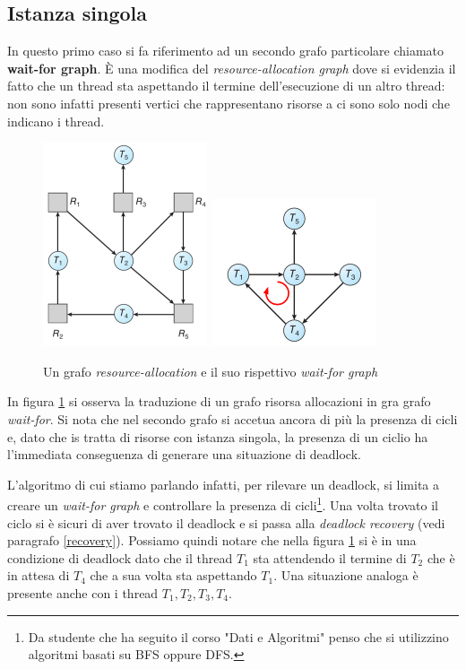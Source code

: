 \subsection{Istanza singola}
In questo primo caso si fa riferimento ad un secondo grafo particolare chiamato \textbf{wait-for graph}. È una modifica del \textit{resource-allocation graph} dove si evidenzia il fatto che un thread sta aspettando il termine dell'esecuzione di un altro thread: non sono infatti presenti vertici che rappresentano risorse a ci sono solo nodi che indicano i thread.
\begin{figure}[h]
    \centering
    \includegraphics[width = .25\textwidth]{../res/imgs/deadlocks/unsafe.png}
    \hspace{10pt}
    \includegraphics[width = .35\textwidth]{../res/imgs/deadlocks/wait-for_graph.png}
    \caption{Un grafo \textit{resource-allocation} e il suo rispettivo \textit{wait-for graph}}
    \label{fig:wait-for}
\end{figure}
In figura \ref{fig:wait-for} si osserva la traduzione di un grafo risorsa allocazioni in gra grafo \textit{wait-for}. Si nota che nel secondo grafo si accetua ancora di più la presenza di cicli e, dato che is tratta di risorse con istanza singola, la presenza di un ciclio ha l'immediata conseguenza di generare una situazione di deadlock.

L'algoritmo di cui stiamo parlando infatti, per rilevare un deadlock, si limita a creare un \textit{wait-for graph} e controllare la presenza di cicli\footnote{Da studente che ha seguito il corso "Dati e Algoritmi" penso che si utilizzino algoritmi basati su BFS oppure DFS.}. Una volta trovato il ciclo si è sicuri di aver trovato il deadlock e si passa alla \textit{deadlock recovery} (vedi paragrafo \ref{recovery}). Possiamo quindi notare che nella figura \ref{fig:wait-for} si è in una condizione di deadlock dato che il thread $T_1$ sta attendendo il termine di $T_2$ che è in attesa di $T_4$ che a sua volta sta aspettando $T_1$. Una situazione analoga è presente anche con i thread $T_1,T_2,T_3,T_4$.
% 
